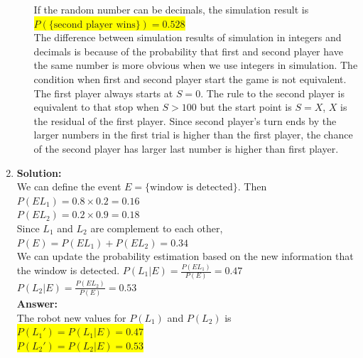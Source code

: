 \documentclass{article}
\newcommand{\myansw}{\textbf{Answer:}\\}
\newcommand{\mysolu}{\textbf{Solution:}\\}
\begin{document}
\begin{enumerate}
\begin{enumerate}
		If the random number can be decimals, the simulation result is\\
		\colorbox{yellow}{${P(\{\text{second player wins}\}) = 0.528}$}\\
		The difference between simulation results of simulation in integers and decimals is because of the probability that first and second player have the same number is more obvious when we use integers in simulation.
		The condition when first and second player start the game is not equivalent. The first player always starts at ${S=0}$. The rule to the second player is equivalent to that stop when ${S>100}$ but the start point is ${S = X}$, ${X}$ is the residual of the first player.
		Since second player's turn ends by the larger numbers in the first trial is higher than the first player, the chance of the second player has larger last number is higher than first player.
	 		
	\end{enumerate}
	\item
	\mysolu
	We can define the event ${E=\{\text{window is detected}\}}$. Then\\
	${P(EL_1)=0.8\times 0.2=0.16}$\\
	${P(EL_2)=0.2\times 0.9=0.18}$\\
	Since ${L_1}$ and ${L_2}$ are complement to each other,\\
	${P(E)=P(EL_1)+P(EL_2)=0.34}$\\
	We can update the probability estimation based on the new information that the window is detected.
	${P(L_1|E)=\frac{P(EL_1)}{P(E)}=0.47}$\\
	${P(L_2|E)=\frac{P(EL_2)}{P(E)}=0.53}$\\
	\myansw
	The robot new values for ${P(L_1)}$ and ${P(L_2)}$ is\\
	\colorbox{yellow}{
		${P(L_1')=P(L_1|E)=0.47}$
	}\\
	\colorbox{yellow}{
		${P(L_2')=P(L_2|E)=0.53}$
	}\\


\end{enumerate}
\end{document}
